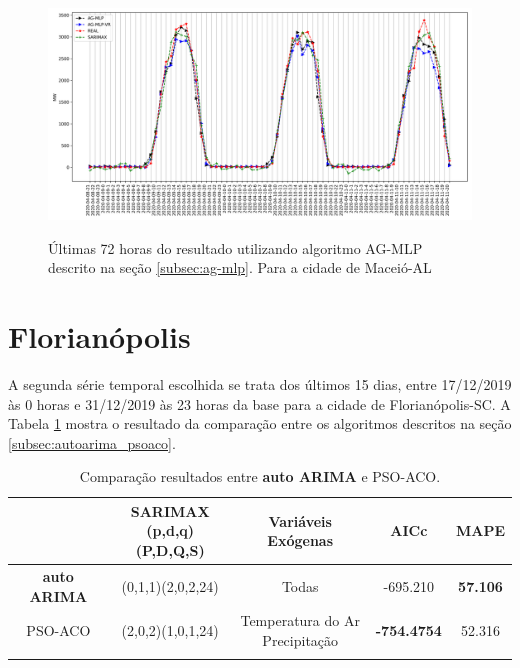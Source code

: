 \begin{figure}[!htbp]
    \centering
    \caption{Últimas 72 horas do resultado utilizando algoritmo AG-MLP descrito na seção \ref{subsec:ag-mlp}. Para a cidade de Maceió-AL}
    \includegraphics[width=\textwidth]{Figuras/cap4/comparison_hibrids_mc.png}
    \label{fig:cap4_maceio_3_days_hibrids}
\end{figure}

\section{Florianópolis}

A segunda série temporal escolhida se trata dos últimos 15 dias, entre 17/12/2019 às 0 horas e 31/12/2019 às 23 horas da base para a cidade de Florianópolis-SC. A Tabela \ref{tab:cap4_comp_flor_autoarima_psoaco} mostra o resultado da comparação entre os algoritmos descritos na seção \ref{subsec:autoarima_psoaco}.

\begin{table}[htbp]
\caption{Comparação resultados entre \textbf{auto ARIMA} e PSO-ACO.}
\begin{center}
\begin{tabular}{ccccc}
                    & \Longstack{SARIMAX \\ (p,d,q)(P,D,Q,S)} & Variáveis Exógenas & AICc & MAPE  \\\hline
\textbf{auto ARIMA} & (0,1,1)(2,0,2,24) & Todas & -695.210 & \textbf{57.106} \\\hline
PSO-ACO             & (2,0,2)(1,0,1,24) & \Longstack{Temperatura do Ar \\ Precipitação} & \textbf{-754.4754} & 52.316 \\\hline
\label{tab:cap4_comp_flor_autoarima_psoaco}
\end{tabular}
\end{center}
\end{table}

